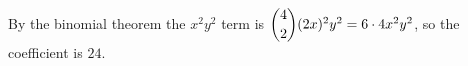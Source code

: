 By the binomial theorem the $x^2y^2$ term is $\dbinom42(2x)^2y^2=6\cdot4x^2y^2$, so the coefficient is $\boxed{24}$.
